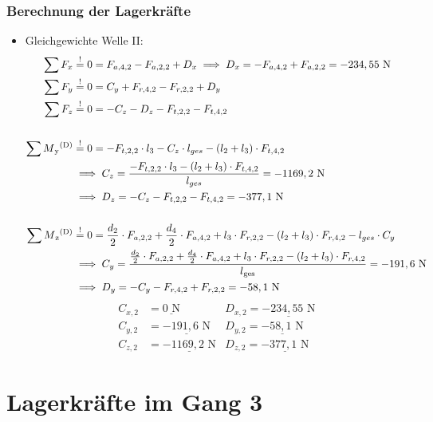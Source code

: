 \subsubsection{Berechnung der Lagerkräfte}
\begin{itemize}
	\item Gleichgewichte Welle II:
	\begin{align*}
	\sum F_x &\overset{!}{=} 0 = F_{a,4,2} -F_{a,2,2} + D_x \implies D_x = -F_{a,4,2} +F_{a,2,2}= -234,55 \text{ N} \\
	\sum F_y &\overset{!}{=} 0 = C_y +F_{r,4,2}- F_{r,2,2}+D_y \\ 
	\sum F_z &\overset{!}{=} 0 = - C_z - D_z - F_{t,2,2} - F_{t,4,2} \\ \\
	\sum M\textsubscript{y}\textsuperscript{(D)} &\overset{!}{=} 0 = - F_{t,2,2} \cdot l_3 - C_z \cdot l_{ges} -(l_2 + l_3) \cdot F_{t,4,2} \\ 
	&\implies C_z = \frac{- F_{t,2,2} \cdot l_3 - (l_2+l_3) \cdot F_{t,4,2} }{l_{ges}} = -1169,2 \text { N} \\ 
	& \implies D_z = - C_z - F_{t,2,2} - F_{t,4,2}= -377,1 \text{ N}\\ \\
	\sum M\textsubscript{z}\textsuperscript{(D)} &\overset{!}{=} 0 = \frac{d_2}{2} \cdot F_{a,2,2} + \frac{d_4}{2} \cdot F_{a,4,2} + l_3 \cdot F_{r,2,2} - (l_2 + l_3) \cdot F_{r,4,2}- l_{ges} \cdot C_y  \\ 
	&\implies C_y = \frac{ \frac{d_2}{2} \cdot F_{a,2,2} + \frac{d_4}{2} \cdot F_{a,4,2}  + l_3 \cdot F_{r,2,2} - (l_2 + l_3) \cdot F_{r,4,2}}{l\textsubscript{ges}} = -191,6 \text{ N}\\ 
	& \implies D_y =  - C_y - F_{r,4,2} + F_{r,2,2} = -58,1\text{ N}
	\end{align*}
	\begin{align*}
	C_{x,2} &= \underline{0\text{ N}} & D_{x,2}= \underline{-234,55\text{ N}}\\
	C_{y,2} &= \underline{-191,6\text{ N}} & D_{y,2}= \underline{-58,1\text{ N}}\\
	C_{z,2} &= \underline{-1169,2\text{ N}} & D_{z,2}= \underline{-377,1\text{ N}}
	\end{align*}
\end{itemize}
\section{Lagerkräfte im Gang 3}
